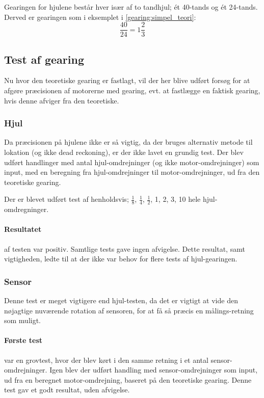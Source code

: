 Gearingen for hjulene består hver især af to tandhjul; ét 40-tands og ét 24-tands.
Derved er gearingen som i eksemplet i \cref{gearing:simpel_teori}: $$ \frac{40}{24} = 1 \frac{2}{3} $$

\subsection{Test af gearing}\label{robot:gearing-test}
Nu hvor den teoretiske gearing er fastlagt, vil der her blive udført forsøg for at afgøre præcisionen af motorerne med gearing, evt. at fastlægge en faktisk gearing, hvis denne afviger fra den teoretiske.

\subsubsection{Hjul}
Da præcisionen på hjulene ikke er så vigtig, da der bruges alternativ metode til lokation (og ikke dead reckoning), er der ikke lavet en grundig test.
Der blev udført handlinger med antal hjul-omdrejninger (og ikke motor-omdrejninger) som input, med en beregning fra hjul-omdrejninger til motor-omdrejninger, ud fra den teoretiske gearing.

Der er blevet udført test af henholdsvis; $\frac{1}{8}$, $\frac{1}{4}$, $\frac{1}{2}$, 1, 2, 3, 10 hele hjul-omdregninger.

\paragraph{Resultatet} af testen var positiv.
Samtlige tests gave ingen afvigelse.
Dette resultat, samt vigtigheden, ledte til at der ikke var behov for flere tests af hjul-gearingen.

\subsubsection{Sensor}
Denne test er meget vigtigere end hjul-testen, da det er vigtigt at vide den nøjagtige nuværende rotation af sensoren, for at få så præcis en målings-retning som muligt.

\paragraph{Første test} var en grovtest, hvor der blev kørt i den samme retning i et antal sensor-omdrejninger.
Igen blev der udført handling med sensor-omdrejninger som input, ud fra en beregnet motor-omdrejning, baseret på den teoretiske gearing.
Denne test gav et godt resultat, uden afvigelse.


